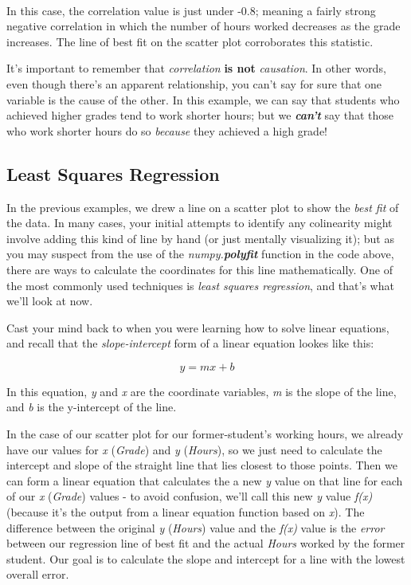 \documentclass[11pt]{article}
\begin{document}
    \begin{center}
    \end{center}
    { \hspace*{\fill} \\}
    
    In this case, the correlation value is just under -0.8; meaning a fairly
strong negative correlation in which the number of hours worked
decreases as the grade increases. The line of best fit on the scatter
plot corroborates this statistic.

It's important to remember that \emph{correlation} \textbf{is not}
\emph{causation}. In other words, even though there's an apparent
relationship, you can't say for sure that one variable is the cause of
the other. In this example, we can say that students who achieved higher
grades tend to work shorter hours; but we \textbf{\emph{can't}} say that
those who work shorter hours do so \emph{because} they achieved a high
grade!

    \subsection{Least Squares Regression}\label{least-squares-regression}

In the previous examples, we drew a line on a scatter plot to show the
\emph{best fit} of the data. In many cases, your initial attempts to
identify any colinearity might involve adding this kind of line by hand
(or just mentally visualizing it); but as you may suspect from the use
of the \emph{numpy.\textbf{polyfit}} function in the code above, there
are ways to calculate the coordinates for this line mathematically. One
of the most commonly used techniques is \emph{least squares regression},
and that's what we'll look at now.

Cast your mind back to when you were learning how to solve linear
equations, and recall that the \emph{slope-intercept} form of a linear
equation lookes like this:

\begin{equation}y = mx + b\end{equation}

In this equation, \emph{y} and \emph{x} are the coordinate variables,
\emph{m} is the slope of the line, and \emph{b} is the y-intercept of
the line.

In the case of our scatter plot for our former-student's working hours,
we already have our values for \emph{x} (\emph{Grade}) and \emph{y}
(\emph{Hours}), so we just need to calculate the intercept and slope of
the straight line that lies closest to those points. Then we can form a
linear equation that calculates the a new \emph{y} value on that line
for each of our \emph{x} (\emph{Grade}) values - to avoid confusion,
we'll call this new \emph{y} value \emph{f(x)} (because it's the output
from a linear equation function based on \emph{x}). The difference
between the original \emph{y} (\emph{Hours}) value and the \emph{f(x)}
value is the \emph{error} between our regression line of best fit and
the actual \emph{Hours} worked by the former student. Our goal is to
calculate the slope and intercept for a line with the lowest overall
error.
\end{document}
